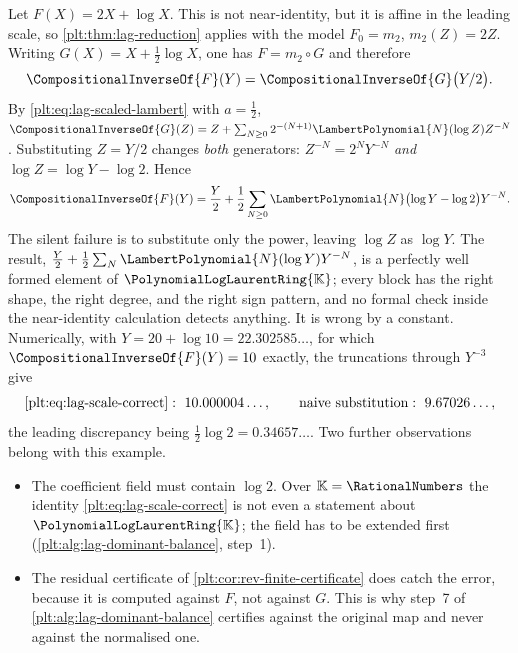 \documentclass[11pt,oneside]{article}
\theoremstyle{plain}
\theoremstyle{definition}
\theoremstyle{remark}
\newcommand{\K}{\mathbb{K}}
\newcommand{\PLlau}{\PolynomialLogLaurentRing{\K}}       %
\newcommand{\compose}{\mathbin{\circ}}
\newcommand{\rev}[1]{\CompositionalInverseOf{#1}}
\newcommand{\LamP}[1]{\LambertPolynomial{#1}}
\begin{document}
\begin{warningbox}[title={A scale change that silently corrupts a correct series}]
\label{plt:warn:lag-scale-trap}
Let \(F(X)=2X+\log X\).  This is not near-identity, but it is affine in the
leading scale, so \cref{plt:thm:lag-reduction} applies with the model
\(F_0=m_2\), \(m_2(Z)=2Z\).  Writing
\(G(X)=X+\tfrac12\log X\), one has \(F=m_2\compose G\) and therefore
\begin{equation}
\label{plt:eq:lag-scaled-correct}
  \rev{F}(Y)=\rev{G}\bigl(Y/2\bigr).
\end{equation}
By \cref{plt:eq:lag-scaled-lambert} with \(a=\tfrac12\),
\(\rev{G}(Z)=Z+\sum_{N\ge0}2^{-(N+1)}\LamP{N}(\log Z)Z^{-N}\).  Substituting
\(Z=Y/2\) changes \emph{both} generators:
\(Z^{-N}=2^{N}Y^{-N}\) \emph{and} \(\log Z=\log Y-\log2\).  Hence
\begin{equation}
\label{plt:eq:lag-scale-correct}
  \rev{F}(Y)=\frac Y2+\frac12\sum_{N\ge0}\LamP{N}\bigl(\log Y-\log2\bigr)Y^{-N}.
\end{equation}
The silent failure is to substitute only the power, leaving \(\log Z\) as
\(\log Y\).  The result,
\(\tfrac Y2+\tfrac12\sum_N\LamP{N}(\log Y)Y^{-N}\), is a perfectly well formed
element of \(\PLlau\); every block has the right shape, the right degree, and
the right sign pattern, and no formal check inside the near-identity
calculation detects anything.  It is wrong by a constant.  Numerically, with
\(Y=20+\log10=22.302585\ldots\), for which \(\rev{F}(Y)=10\) exactly, the
truncations through \(Y^{-3}\) give
\[
  \text{\cref{plt:eq:lag-scale-correct}}:\ 10.000004\ldots,
  \qquad
  \text{naive substitution}:\ 9.67026\ldots,
\]
the leading discrepancy being \(\tfrac12\log2=0.34657\ldots\).  Two further
observations belong with this example.
\begin{itemize}
\item The coefficient field must contain \(\log2\).  Over \(\K=\RationalNumbers\)
      the identity \cref{plt:eq:lag-scale-correct} is not even a statement about
      \(\PLlau\); the field has to be extended first
      (\cref{plt:alg:lag-dominant-balance}, step~1).
\item The residual certificate of \cref{plt:cor:rev-finite-certificate} does catch the
      error, because it is computed against \(F\), not against \(G\).  This is
      why step~7 of \cref{plt:alg:lag-dominant-balance} certifies against the
      original map and never against the normalised one.
\end{itemize}
\end{warningbox}
\end{document}
